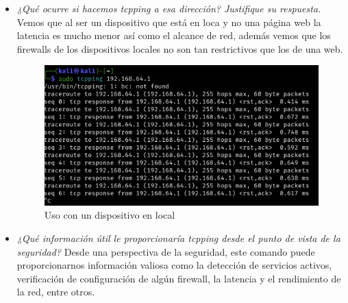 \documentclass[12pt]{book}
\begin{document}
\begin{itemize}
    \item \textit{¿Qué ocurre si hacemos tcpping a esa dirección? Justifique su respuesta.}
    \newline
    \newline
    Vemos que al ser un dispositivo que está en loca y no una página web la latencia es mucho menor así como el alcance de red, además vemos que los firewalls de los dispositivos locales no son tan restrictivos que los de una web.
    \begin{figure}[h]
        \centering
        \includegraphics[width=.7\linewidth]{Practica 3y4/images/Screenshot 2024-11-07 at 20.18.44.png}
        \caption{Uso con un dispositivo en local}
        \label{fig:enter-label}
    \end{figure}
    \item \textit{¿Qué información útil le proporcionaría tcpping desde el punto de vista de la seguridad?}
    \newline
    \newline
    Desde una perspectiva de la seguridad, este comando puede proporcionarnos información valiosa como la detección de servicios activos, verificación de configuración de algún firewall, la latencia y el rendimiento de la red, entre otros.
\end{itemize}
\end{document}
